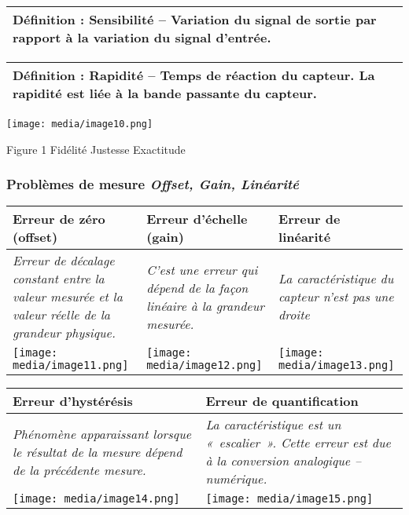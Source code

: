 \documentclass[
]{article}
\begin{document}
\begin{longtable}[]{@{}l@{}}
\toprule
\endhead
\textbf{Définition : Sensibilité --} Variation du signal de sortie par
rapport à la variation du signal d'entrée. \\
\bottomrule
\end{longtable}

\begin{longtable}[]{@{}l@{}}
\toprule
\endhead
\textbf{Définition : Rapidité --} Temps de réaction du capteur. La
rapidité est liée à la bande passante du capteur. \\
\bottomrule
\end{longtable}

\texttt{[image: media/image10.png]}

Figure 1 Fidélité Justesse Exactitude

\hypertarget{probluxe8mes-de-mesure-offset-gain-linuxe9arituxe9}{%
\subsubsection{\texorpdfstring{Problèmes de mesure \emph{Offset, Gain,
Linéarité}}{Problèmes de mesure Offset, Gain, Linéarité}}\label{probluxe8mes-de-mesure-offset-gain-linuxe9arituxe9}}

\begin{longtable}[]{@{}lll@{}}
\toprule
\textbf{Erreur de zéro (offset)} & \textbf{Erreur d'échelle (gain)} &
\textbf{Erreur de linéarité} \\
\midrule
\endhead
\emph{Erreur de décalage constant entre la valeur mesurée et la valeur
réelle de la grandeur physique.} & \emph{C'est une erreur qui dépend de
la façon linéaire à la grandeur mesurée.} & \emph{La caractéristique du
capteur n'est pas une droite} \\
\texttt{[image: media/image11.png]} &
\texttt{[image: media/image12.png]} &
\texttt{[image: media/image13.png]} \\
\bottomrule
\end{longtable}

\begin{longtable}[]{@{}ll@{}}
\toprule
\textbf{Erreur d'hystérésis} & \textbf{Erreur de quantification} \\
\midrule
\endhead
\emph{Phénomène apparaissant lorsque le résultat de la mesure dépend de
la précédente mesure.} & \emph{La caractéristique est un «~escalier~».
Cette erreur est due à la conversion analogique -- numérique.} \\
\texttt{[image: media/image14.png]} &
\texttt{[image: media/image15.png]} \\
\bottomrule
\end{longtable}
\end{document}
